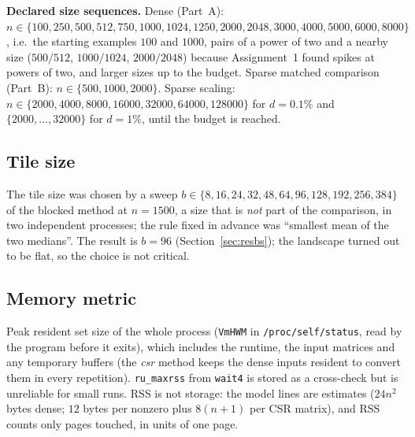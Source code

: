 \textbf{Declared size sequences.} Dense (Part~A): $n\in\{100,\allowbreak 250,\allowbreak 500,\allowbreak 512,\allowbreak 750,\allowbreak 1000,\allowbreak 1024,\allowbreak 1250,\allowbreak 2000,\allowbreak 2048,\allowbreak 3000,\allowbreak 4000,\allowbreak 5000,\allowbreak 6000,\allowbreak 8000\}$, i.e.\ the starting examples $100$ and $1000$, pairs of a
power of two and a nearby size ($500/512$, $1000/1024$, $2000/2048$) because Assignment~1 found spikes at powers of two, and larger sizes up to the budget. Sparse matched comparison (Part~B):
$n\in\{500,\allowbreak 1000,\allowbreak 2000\}$. Sparse scaling: $n\in\{2000,\allowbreak 4000,\allowbreak 8000,\allowbreak 16000,\allowbreak 32000,\allowbreak 64000,\allowbreak 128000\}$ for $d=0.1\%$ and $\{2000,\dots,32000\}$ for $d=1\%$, until the budget is reached.

\subsection{Tile size}
\label{sec:bs}
The tile size was chosen by a sweep $b\in\{8,16,24,32,48,64,96,128,192,256,384\}$ of the blocked method at $n=1500$, a size that is \emph{not} part of the comparison, in two independent
processes; the rule fixed in advance was ``smallest mean of the two medians''. The result is $b=96$ (Section~\ref{sec:resbs}); the landscape turned out to be flat, so the choice is not critical.

\subsection{Memory metric}
Peak resident set size of the whole process (\texttt{VmHWM} in \texttt{/proc/self/status}, read by the program before it exits), which includes the runtime, the input matrices and any
temporary buffers (the \emph{csr} method keeps the dense inputs resident to convert them in every repetition). \texttt{ru\_maxrss} from \texttt{wait4} is stored as a cross-check but is
unreliable for small runs. RSS is not storage: the model lines are estimates ($24n^2$ bytes dense; $12$ bytes per nonzero plus $8(n+1)$ per CSR matrix), and
RSS counts only pages touched, in units of one page.

